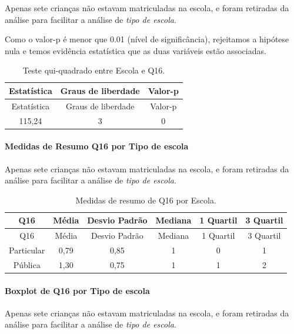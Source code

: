 \documentclass[]{article}
\let\oldparagraph\paragraph
\renewcommand{\paragraph}[1]{\oldparagraph{#1}\mbox{}}
\begin{document}
Apenas sete crianças não estavam matriculadas na escola, e foram retiradas da análise para facilitar a análise de \emph{tipo de escola}.

Como o valor-p é menor que 0.01 (nível de significância), rejeitamos a hipótese nula e temos evidência estatística que as duas variáveis estão associadas.

\begin{longtable}[]{@{}ccc@{}}
\caption{\label{tab:unnamed-chunk-173}Teste qui-quadrado entre Escola e Q16.}\tabularnewline
\toprule
Estatística & Graus de liberdade & Valor-p\tabularnewline
\midrule
\endfirsthead
\toprule
Estatística & Graus de liberdade & Valor-p\tabularnewline
\midrule
\endhead
115,24 & 3 & 0\tabularnewline
\bottomrule
\end{longtable}

\cleardoublepage

\hypertarget{medidas-de-resumo-q16-por-tipo-de-escola}{%
\paragraph{Medidas de Resumo Q16 por Tipo de escola}\label{medidas-de-resumo-q16-por-tipo-de-escola}}

Apenas sete crianças não estavam matriculadas na escola, e foram retiradas da análise para facilitar a análise de \emph{tipo de escola}.

\begin{longtable}[]{@{}cccccc@{}}
\caption{\label{tab:unnamed-chunk-174}Medidas de resumo de Q16 por Escola.}\tabularnewline
\toprule
Q16 & Média & Desvio Padrão & Mediana & 1 Quartil & 3 Quartil\tabularnewline
\midrule
\endfirsthead
\toprule
Q16 & Média & Desvio Padrão & Mediana & 1 Quartil & 3 Quartil\tabularnewline
\midrule
\endhead
Particular & 0,79 & 0,85 & 1 & 0 & 1\tabularnewline
Pública & 1,30 & 0,75 & 1 & 1 & 2\tabularnewline
\bottomrule
\end{longtable}

\hypertarget{boxplot-de-q16-por-tipo-de-escola}{%
\paragraph{Boxplot de Q16 por Tipo de escola}\label{boxplot-de-q16-por-tipo-de-escola}}

Apenas sete crianças não estavam matriculadas na escola, e foram retiradas da análise para facilitar a análise de \emph{tipo de escola}.
\end{document}

